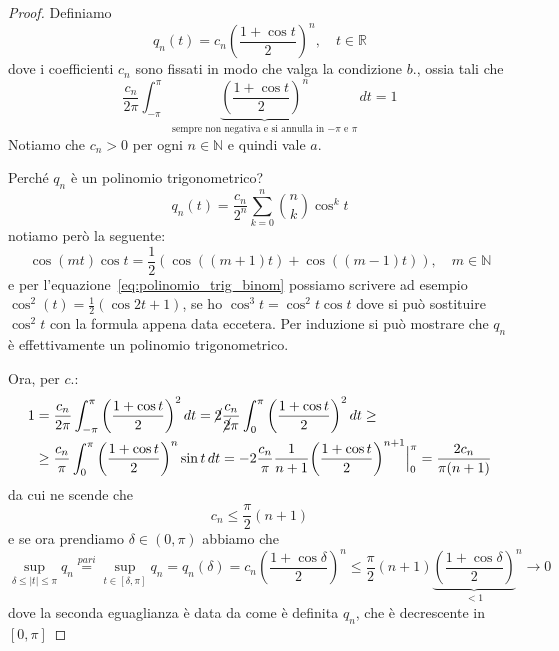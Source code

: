 \begin{proof}
    Definiamo
    \[
      q_{n}{(t)} = c_{n}{\left( \frac{1 + \cos t}{2} \right)} ^{n}, \quad t \in
      \mathbb{R}
    \]
    dove i coefficienti \(c_{n}\) sono fissati in modo che valga la condizione
    \(b.\), ossia tali che
    \[
        \frac{c_{n}}{2\pi} \int_{-\pi}^{\pi} \underbrace{{\left( \frac{1 + \cos t}{2}
    \right)}^{n}}_{\text{sempre non negativa e si annulla in \(-\pi\) e \(\pi\)}} \,dt = 1
    \]
    Notiamo che \(c_{n} > 0\) per ogni \(n \in \mathbb{N}\) e quindi vale \(a.\)

    Perché \(q_{n}\) è un polinomio trigonometrico?
    \begin{equation}\label{eq:polinomio_trig_binom}
        q_{n}{(t)} = \frac{c_{n}}{2^{n}} \sum_{k=0}^{n} \binom{n}{k} \cos^{k}{t} 
    \end{equation}
     notiamo però la seguente:
     \[
       \cos{(mt)}\cos t = \frac{1}{2}{\left( \cos{{({(m+1)}t)}} +
       \cos{({(m-1)}t)} \right)} , \quad m \in \mathbb{N}
     \]
     e per l'equazione~\ref{eq:polinomio_trig_binom} possiamo scrivere ad esempio
     \(\cos^2{(t)} = \frac{1}{2}{(\cos 2t + 1)}\), se ho \(\cos^3 t = \cos ^2 t
     \cos t\) dove si può sostituire \(\cos^2 t\) con la formula appena data
     eccetera. Per induzione si può mostrare che \(q_{n}\) è effettivamente un
     polinomio trigonometrico.

     Ora, per \(c.\):
     \begin{align*}
         1 &= \frac{c_{n}}{2\pi} \int_{-\pi}^{\pi} {\left( \frac{1 + \cos t}{2}
       \right)}^2  \,d t = \cancel{2} \frac{c_{n}}{\cancel{2}\pi} \int_{0}^{\pi}
                 {\left( \frac{1+\cos t}{2} \right)}^2 \,d t  \ge \\
    &\ge \frac{c_{n}}{\pi}\int_{0}^{\pi} {\left( {\frac{1 + \cos t}{2}}
    \right)}^{n} \sin t  \,d t = -2 \frac{c_{n}}{\pi} \frac{1}{n+1} {\left(
    \frac{1 + \cos t}{2} \right)}^{n+1} \Big|_{0}^{\pi} = \frac{2 c_{n}}{\pi{(n+1)}}
     \end{align*}
     da cui ne scende che
     \[
       c_{n} \le \frac{\pi}{2}{(n+1)}
     \]
     e se ora prendiamo \(\delta \in {(0, \pi)}\) abbiamo che
     \[
         \sup_{\delta \le  |t| \le \pi} q_{n} \overset{pari}{=} \sup_{t \in
         [\delta, \pi]} q_{n} = q_{n}{(\delta)} = c_{n}{\left( \frac{1 + \cos
         \delta}{2} \right)}^{n} \le \frac{\pi}{2}{(n+1)}{\underbrace{\left( \frac{1 + \cos
 \delta}{2} \right)}_{<1}} ^{n} \to 0
     \]
     dove la seconda eguaglianza è data da come è definita \(q_{n}\), che è
     decrescente in \({[0, \pi]}\) 
\end{proof}

